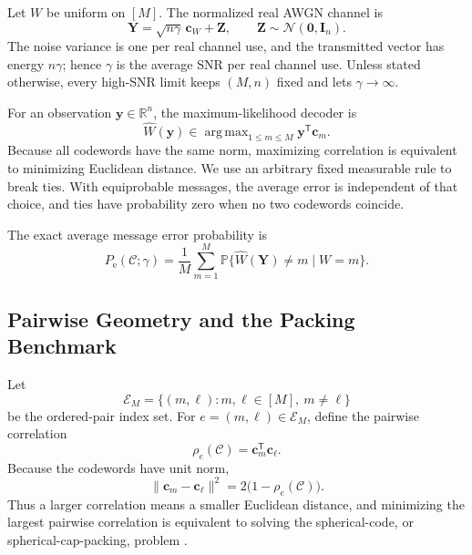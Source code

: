\documentclass[12pt,draftclsnofoot,onecolumn]{IEEEtran}
\DeclareMathOperator*{\argmax}{arg\,max}
\newcommand{\R}{\mathbb{R}}
\newcommand{\Pp}{\mathbb{P}}
\newcommand{\Normal}{\mathcal{N}}
\newcommand{\cC}{\mathcal{C}}
\newcommand{\cE}{\mathcal{E}}
\newcommand{\Pe}{P_{\mathrm e}}
\newcommand{\bc}{\bm c}
\newcommand{\by}{\bm y}
\newcommand{\bY}{\bm Y}
\newcommand{\bI}{\mathbf I}
\newcommand{\bZ}{\bm Z}
\newcommand{\bzero}{\bm 0}
\newcommand{\T}{\mathsf T}
\theoremstyle{definition}
\begin{document}
Let \(W\) be uniform on \([M]\).  The normalized real AWGN channel is
\begin{equation}
  \bY=\sqrt{n\gamma}\,\bc_W+\bZ,
  \qquad
  \bZ\sim\Normal(\bzero,\bI_n).
  \label{eq:awgn-channel}
\end{equation}
The noise variance is one per real channel use, and the transmitted
vector has energy \(n\gamma\); hence \(\gamma\) is the average SNR per
real channel use.  Unless stated otherwise, every high-SNR limit keeps
\((M,n)\) fixed and lets \(\gamma\to\infty\).

For an observation \(\by\in\R^n\), the maximum-likelihood decoder is
\begin{equation}
  \widehat W(\by)\in\argmax_{1\le m\le M}\by^\T\bc_m.
  \label{eq:ml-decoder}
\end{equation}
Because all codewords have the same norm, maximizing correlation is
equivalent to minimizing Euclidean distance.  We use an arbitrary fixed
measurable rule to break ties.  With equiprobable messages, the average
error is independent of that choice, and ties have probability zero when
no two codewords coincide.

The exact average message error probability is
\begin{equation}
  \Pe(\cC;\gamma)
  =\frac1M\sum_{m=1}^M
  \Pp\{\widehat W(\bY)\ne m\mid W=m\}.
  \label{eq:Pe-def}
\end{equation}

\subsection{Pairwise Geometry and the Packing Benchmark}
\label{subsec:pairwise-packing}

Let
\begin{equation*}
  \cE_M=\{(m,\ell):m,\ell\in[M],\ m\ne\ell\}
\end{equation*}
be the ordered-pair index set.  For \(e=(m,\ell)\in\cE_M\), define
the pairwise correlation
\begin{equation}
  \rho_e(\cC)=\bc_m^\T\bc_\ell.
  \label{eq:pairwise-correlation-def}
\end{equation}
Because the codewords have unit norm,
\begin{equation}
  \|\bc_m-\bc_\ell\|^2=2\bigl(1-\rho_e(\cC)\bigr).
  \label{eq:correlation-distance-relation}
\end{equation}
Thus a larger correlation means a smaller Euclidean distance, and
minimizing the largest pairwise correlation is equivalent to solving the
spherical-code, or spherical-cap-packing, problem
\cite{Rankin1955,ConwaySloane1999,EricsonZinoviev2001}.
\end{document}
